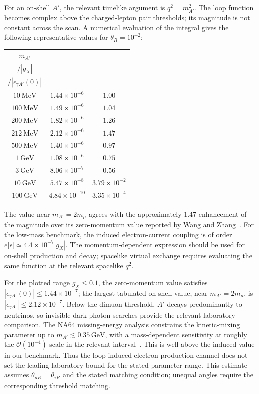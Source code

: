 \documentclass[12pt,a4paper]{article}
\begin{document}
For an on-shell \(A'\), the relevant timelike argument is \(q^2=m_{A'}^2\). The loop function becomes complex above the charged-lepton pair thresholds; its magnitude is not constant across the scan. A numerical evaluation of the integral gives the following representative values for \(\theta_R=10^{-2}\):
\begin{center}
\small
\begin{tabular}{c|c|c}
\(m_{A'}\) &
\shortstack{\(\left|\epsilon_{\gamma A'}(m_{A'}^2)\right|\)\\ \(/\left|g_X\right|\)} &
\shortstack{\(\left|\epsilon_{\gamma A'}(m_{A'}^2)\right|\)\\ \(/\left|\epsilon_{\gamma A'}(0)\right|\)}\\
\hline
\(10~\mathrm{MeV}\) & \(1.44\times10^{-6}\) & \(1.00\)\\
\(100~\mathrm{MeV}\) & \(1.49\times10^{-6}\) & \(1.04\)\\
\(200~\mathrm{MeV}\) & \(1.82\times10^{-6}\) & \(1.26\)\\
\(212~\mathrm{MeV}\) & \(2.12\times10^{-6}\) & \(1.47\)\\
\(500~\mathrm{MeV}\) & \(1.40\times10^{-6}\) & \(0.97\)\\
\(1~\mathrm{GeV}\) & \(1.08\times10^{-6}\) & \(0.75\)\\
\(3~\mathrm{GeV}\) & \(8.06\times10^{-7}\) & \(0.56\)\\
\(10~\mathrm{GeV}\) & \(5.47\times10^{-8}\) & \(3.79\times10^{-2}\)\\
\(100~\mathrm{GeV}\) & \(4.84\times10^{-10}\) & \(3.35\times10^{-4}\)
\end{tabular}
\end{center}
The value near \(m_{A'}=2m_\mu\) agrees with the approximately \(1.47\) enhancement of the magnitude over its zero-momentum value reported by Wang and Zhang~\cite{Wang:2026supernova}. For the low-mass benchmark, the induced electron-current coupling is of order \(e|\epsilon|\simeq4.4\times10^{-7}|g_X|\). The momentum-dependent expression should be used for on-shell production and decay; spacelike virtual exchange requires evaluating the same function at the relevant spacelike \(q^2\).

For the plotted range \(g_X\leq0.1\), the zero-momentum value satisfies \(|\epsilon_{\gamma A'}(0)|\leq1.44\times10^{-7}\); the largest tabulated on-shell value, near \(m_{A'}=2m_\mu\), is \(|\epsilon_{\gamma A'}|\leq2.12\times10^{-7}\). Below the dimuon threshold, \(A'\) decays predominantly to neutrinos, so invisible-dark-photon searches provide the relevant laboratory comparison. The NA64 missing-energy analysis constrains the kinetic-mixing parameter up to \(m_{A'}\lesssim0.35\,\mathrm{GeV}\), with a mass-dependent sensitivity at roughly the \(\mathcal O(10^{-4})\) scale in the relevant interval~\cite{NA64:2023lightDM}. This is well above the induced value in our benchmark. Thus the loop-induced electron-production channel does not set the leading laboratory bound for the stated parameter range. This estimate assumes \(\theta_{\mu R}=\theta_{\tau R}\) and the stated matching condition; unequal angles require the corresponding threshold matching.
\end{document}
